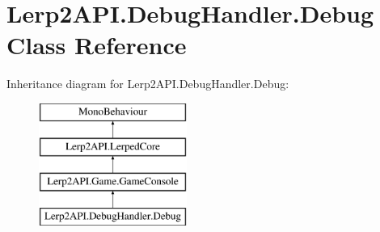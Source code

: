 \hypertarget{class_lerp2_a_p_i_1_1_debug_handler_1_1_debug}{}\section{Lerp2\+A\+P\+I.\+Debug\+Handler.\+Debug Class Reference}
\label{class_lerp2_a_p_i_1_1_debug_handler_1_1_debug}
Inheritance diagram for Lerp2\+A\+P\+I.\+Debug\+Handler.\+Debug\+:\begin{figure}[H]
\begin{center}
\leavevmode
\includegraphics[height=4.000000cm]{class_lerp2_a_p_i_1_1_debug_handler_1_1_debug}
\end{center}
\end{figure}
